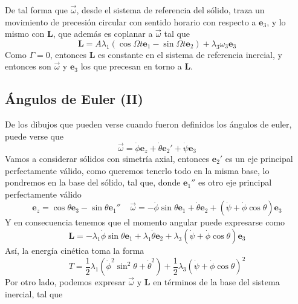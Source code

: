 De tal forma que $\vec{\omega}$, desde el sistema de referencia del sólido, traza un movimiento de precesión circular con sentido horario con respecto a $\mathbf{e}_3$, y lo mismo con $\mathbf{L}$, que además es coplanar a $\vec{\omega}$ tal que
\begin{equation} \label{6.1.1}
    \mathbf{L} = A\lambda_1(\cos\Omega t \mathbf{e}_1 - \sin\Omega t \mathbf{e}_2) + \lambda_3 \omega_3 \mathbf{e}_3
\end{equation}
Como $\mathcal{\Gamma} = 0$, entonces $\mathbf{L}$ es constante en el sistema de referencia inercial, y entonces son $\vec{\omega}$ y $\mathbf{e}_3$ los que precesan en torno a $\mathbf{L}$.
\subsection{Ángulos de Euler (II)}
De los dibujos que pueden verse cuando fueron definidos los ángulos de euler, puede verse que 
\begin{equation} \label{6.1.1}
    \vec{\omega} = \dot{\phi} \mathbf{e}_z + \dot{\theta} \mathbf{e}_2'+\dot{\psi} \mathbf{e}_3
\end{equation}
Vamos a considerar sólidos con simetría axial, entonces $\mathbf{e}_2'$ es un eje principal perfectamente válido, como queremos tenerlo todo en la misma base, lo pondremos en la base del sólido, tal que, donde $\mathbf{e}_1''$ es otro eje principal perfectamente válido
\begin{equation} \label{6.1.1}
    \mathbf{e}_z = \cos\theta \mathbf{e}_3 - \sin\theta \mathbf{e}_1'' \ \ \ \ \ \vec{\omega} = -\dot{\phi}\sin\theta \mathbf{e}_1 + \dot{\theta} \mathbf{e}_2+(\dot{\psi}+\dot{\phi}\cos\theta)\mathbf{e}_3
\end{equation}
Y en consecuencia tenemos que el momento angular puede expresarse como
\begin{equation} \label{6.1.1}
    \mathbf{L} = -\lambda_1\dot{\phi}\sin\theta \mathbf{e}_1 + \lambda_1 \dot{\theta} \mathbf{e}_2+\lambda_3(\dot{\psi}+\dot{\phi}\cos\theta)\mathbf{e}_3
\end{equation}
Así, la energía cinética toma la forma
\begin{equation} \label{6.1.1}
    T = \frac{1}{2}\lambda_1\left(\dot{\phi}^2\sin^2\theta+ \dot{\theta}^2\right)+\frac{1}{2}\lambda_3\left(\dot{\psi}+\dot{\phi}\cos\theta\right)^2
\end{equation}
Por otro lado, podemos expresar $\vec{\omega}$ y $\mathbf{L}$ en términos de la base del sistema inercial, tal que
